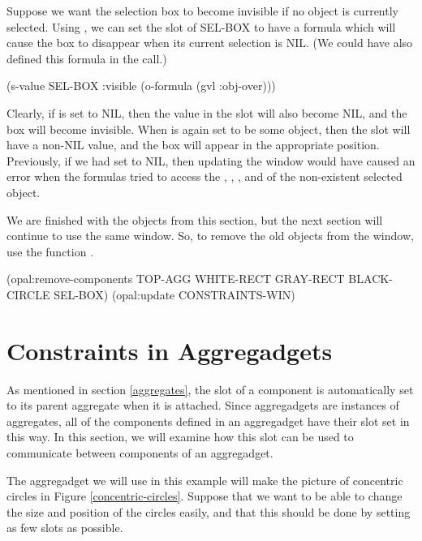 Suppose we want the selection box to become invisible if no object is
currently selected.  Using , we can set the 
slot of SEL-BOX to have a formula which will cause the box to
disappear when its current selection is NIL.  (We could have also
defined this formula in the  call.)

\begin{programexample}
(s-value SEL-BOX :visible (o-formula (gvl :obj-over)))
\end{programexample}

Clearly, if  is set to NIL, then the value in the
 slot will also become NIL, and the box will become
invisible.  When  is again set to be some object, then
the  slot will have a non-NIL value, and the box will
appear in the appropriate position.  Previously, if we had set
 to NIL, then updating the window would have caused an
error when the formulas tried to access the , ,
, and  of the non-existent selected object.

We are finished with the objects from this section, but the next
section will continue to use the same window.  So, to remove the old
objects from the window, use the function .

\begin{programexample}
(opal:remove-components TOP-AGG WHITE-RECT GRAY-RECT BLACK-CIRCLE SEL-BOX)
(opal:update CONSTRAINTS-WIN)
\end{programexample}


\section{Constraints in Aggregadgets}
\label{aggregadget-ex}

As mentioned in section \ref{aggregates}, the  slot of a
component is automatically set to its parent aggregate when it is
attached.  Since aggregadgets are instances of aggregates, all of the
components defined in an aggregadget have their  slot set
in this way.  In this section, we will examine how this slot can be
used to communicate between components of an aggregadget.

The aggregadget we will use in this example will make the picture of
concentric circles in Figure \ref{concentric-circles}.  Suppose that
we want to be able to change the size and position of the circles
easily, and that this should be done by setting as few slots as
possible.

